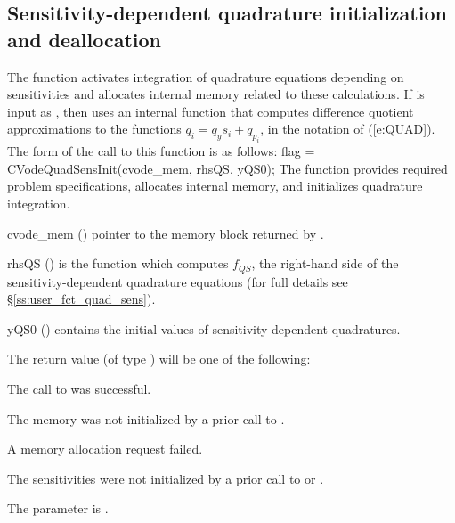 
\subsection{Sensitivity-dependent quadrature initialization and deallocation}%
\label{ss:quad_sens_init}

The function  activates integration of quadrature
equations depending on sensitivities and allocates internal memory
related to these calculations.  If  is input as ,
then {\cvodes} uses an internal function that computes difference quotient
approximations to the functions $\bar{q}_i = q_y s_i + q_{p_i}$, in the
notation of (\ref{e:QUAD}).
The form of the call to this function is as follows:
{
flag = CVodeQuadSensInit(cvode\_mem, rhsQS, yQS0);
}
{
  The function  provides required problem specifications,
  allocates internal memory, and initializes quadrature integration.
}
{
  \begin{args}
  \item[cvode\_mem] ()
    pointer to the {\cvodes} memory block returned by .
  \item[rhsQS] ()
    is the {\CC} function which computes $f_{QS}$, the right-hand side of the 
    sensitivity-dependent quadrature equations
    (for full details see \S\ref{ss:user_fct_quad_sens}).
  \item[yQS0] ()
    contains the initial values of sensitivity-dependent quadratures.
  \end{args}
}
{
  The return value  (of type ) will be one of the following:
  \begin{args}
  \item[\Id{CV\_SUCCESS}]
    The call to  was successful.
  \item[\Id{CVODE\_MEM\_NULL}] 
    The {\cvodes} memory was not initialized by a prior call to .
  \item[\Id{CVODE\_MEM\_FAIL}] 
    A memory allocation request failed.
  \item[\Id{CV\_NO\_SENS}] 
    The sensitivities were not initialized by a prior call to  or .
  \item[\Id{CV\_ILL\_INPUT}]
    The parameter  is .
  \end{args}
}
